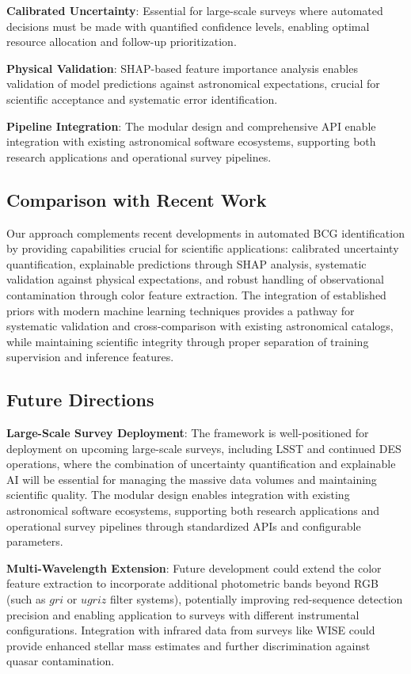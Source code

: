 \documentclass[twocolumn,10pt]{aastex631}
\begin{document}
\textbf{Calibrated Uncertainty}: Essential for large-scale surveys where automated decisions must be made with quantified confidence levels, enabling optimal resource allocation and follow-up prioritization.

\textbf{Physical Validation}: SHAP-based feature importance analysis enables validation of model predictions against astronomical expectations, crucial for scientific acceptance and systematic error identification.

\textbf{Pipeline Integration}: The modular design and comprehensive API enable integration with existing astronomical software ecosystems, supporting both research applications and operational survey pipelines.

\subsection{Comparison with Recent Work}

Our approach complements recent developments in automated BCG identification by providing capabilities crucial for scientific applications: calibrated uncertainty quantification, explainable predictions through SHAP analysis, systematic validation against physical expectations, and robust handling of observational contamination through color feature extraction. The integration of established priors \citep{Rykoff2014redMaPPer} with modern machine learning techniques provides a pathway for systematic validation and cross-comparison with existing astronomical catalogs, while maintaining scientific integrity through proper separation of training supervision and inference features.

\subsection{Future Directions}

\textbf{Large-Scale Survey Deployment}: The framework is well-positioned for deployment on upcoming large-scale surveys, including LSST and continued DES operations, where the combination of uncertainty quantification and explainable AI will be essential for managing the massive data volumes and maintaining scientific quality. The modular design enables integration with existing astronomical software ecosystems, supporting both research applications and operational survey pipelines through standardized APIs and configurable parameters.

\textbf{Multi-Wavelength Extension}: Future development could extend the color feature extraction to incorporate additional photometric bands beyond RGB (such as $gri$ or $ugriz$ filter systems), potentially improving red-sequence detection precision and enabling application to surveys with different instrumental configurations. Integration with infrared data from surveys like WISE could provide enhanced stellar mass estimates and further discrimination against quasar contamination.
\end{document}
